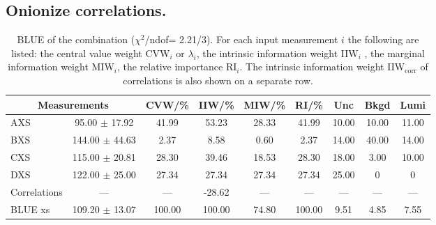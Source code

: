 \subsection{Onionize correlations.}
\begin{table}[H]
\scriptsize
\begin{center}
\renewcommand{\arraystretch}{1.1}
\begin{tabular}{|lc|c|c|c|c|ccc|}
\hline
\multicolumn{2}{|c|}{Measurements} & CVW/\%  & IIW/\%  & MIW/\%  & RI/\%  & {\tiny Unc} & {\tiny Bkgd} & {\tiny Lumi}\\
\hline
AXS &      95.00 $\pm$      17.92 &      41.99 &      53.23 &      28.33 &      41.99 &      10.00 &      10.00 &      11.00\\
BXS &     144.00 $\pm$      44.63 &       2.37 &       8.58 &       0.60 &       2.37 &      14.00 &      40.00 &      14.00\\
CXS &     115.00 $\pm$      20.81 &      28.30 &      39.46 &      18.53 &      28.30 &      18.00 &       3.00 &      10.00\\
DXS &     122.00 $\pm$      25.00 &      27.34 &      27.34 &      27.34 &      27.34 &      25.00 &  0 &  0\\
Correlations & --- & --- &     -28.62 & --- & --- & --- & --- & ---\\
\hline
BLUE {\tiny xs} &     109.20 $\pm$      13.07 &     100.00 &     100.00 &      74.80 &     100.00 &       9.51 &       4.85 &       7.55\\
\hline
\end{tabular}
\caption{BLUE of the combination ($\chi^2$/ndof=      2.21/3).
 For each input measurement $i$ the following are listed: the central value weight CVW$_i$ or $\lambda_i$, the intrinsic information weight IIW$_i$ , the marginal information weight MIW$_i$, the relative importance RI$_i$. The intrinsic information weight IIW$_{\mathrm{corr}}$ of correlations is also shown on a separate row.}
\renewcommand{\arraystretch}{1}
\end{center}
\end{table}
